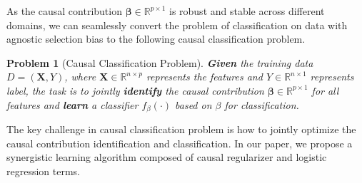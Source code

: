 \documentclass[sigconf]{acmart}
\newtheorem{problem}{Problem}
\begin{document}
As the causal contribution $\bm{\beta} \in \mathbb{R}^{p\times 1}$ is robust and stable across different domains, we can seamlessly convert the problem of classification on data with agnostic selection bias to the following causal classification problem.

\begin{problem}[Causal Classification Problem]
\textbf{Given} the training data $D=(\bm{X},Y)$, where $\bm{X} \in \mathbb{R}^{n\times p}$ represents the features and $Y \in \mathbb{R}^{n\times 1}$ represents label, the task is to jointly \textbf{identify} the causal contribution $\bm{\beta} \in \mathbb{R}^{p\times 1}$ for all features and \textbf{learn} a classifier $f_{\beta}(\cdot)$ based on $\beta$ for classification.
\end{problem}

The key challenge in causal classification problem is how to jointly optimize the causal contribution identification and classification.
In our paper, we propose a synergistic learning algorithm composed of causal regularizer and logistic regression terms.
\end{document}
